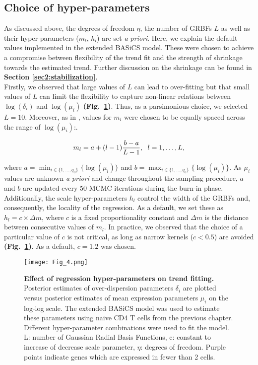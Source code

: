 \subsection{Choice of hyper-parameters} \label{sec2:hyper-parameters}

As discussed above, the degrees of freedom $\eta$, the number of GRBFs  $L$ as well as their hyper-parameters ($m_l$, $h_l$) are set \emph{a priori}. Here, we explain the default values implemented in the extended BASiCS model. These were chosen to achieve a compromise between flexibility of the trend fit and the strength of shrinkage towards the estimated trend. Further discussion on the shrinkage can be found in \textbf{Section \ref{sec2:stabilization}}. \\ 

Firstly, we observed that large values of $L$ can lead to over-fitting but that small values of $L$ can limit the flexibility to capture non-linear relations between $\log(\delta_i)$ and $\log(\mu_i)$ \textbf{(Fig.~\ref{fig2:choice_hyper})}. Thus, as a parsimonious choice, we selected $L = 10$. Moreover, as in \cite{Kapourani2016}, values for $m_l$ were chosen to be equally spaced across the range of $\log(\mu_i)$:. 

\begin{equation} m_l = a + (l-1)\frac{b - a }{L-1}, \hspace{0.2cm}  l=1,\ldots, L, \end{equation} 

where $a=\min_{i\in\{1,\ldots,q_0\}}\{\log(\mu_i)\}$ and $b=\max_{i\in\{1,\ldots,q_0\}}\{\log(\mu_i)\}$. As $\mu_i$ values are unknown \emph{a priori} and change throughout the sampling procedure, $a$ and $b$ are updated every 50 MCMC iterations during the burn-in phase. Additionally, the scale hyper-parameters $h_l$ control the width of the GRBFs and, consequently, the locality of the regression. As a default, we set these as $h_l = c \times \Delta m$, where $c$ is a fixed proportionality constant and $\Delta m$ is the distance between consecutive values of $m_l$. In practice, we observed that the choice of a particular value of $c$ is not critical, as long as narrow kernels ($c<0.5$) are avoided \textbf{(Fig.~\ref{fig2:choice_hyper})}. As a default, $c = 1.2$ was chosen. \\

\begin{figure}[!h]
\centering
\texttt{[image: Fig\_4.png]}
\caption[Effect of regression hyper-parameters on trend fitting]{\textbf{Effect of regression hyper-parameters on trend fitting.}\\
Posterior estimates of over-dispersion parameters $\delta_i$ are plotted versus posterior estimates of mean expression parameters $\mu_i$ on the log-log scale. The extended BASiCS model was used to estimate these parameters using naive CD4\plus{} T cells from the previous chapter. Different hyper-parameter combinations were used to fit the model. L: number of Gaussian Radial Basis Functions, c: constant to increase of decrease scale parameter, $\eta$: degrees of freedom. Purple points indicate genes which are expressed in fewer than 2 cells.}
\label{fig2:choice_hyper}
\end{figure}

